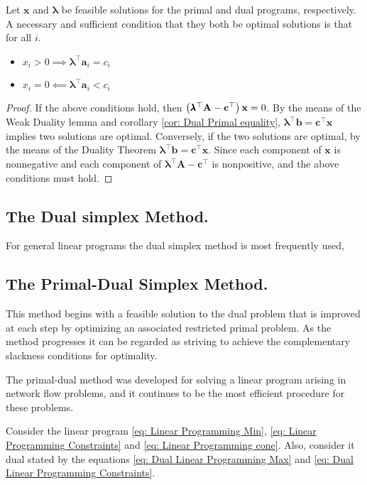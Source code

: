 \begin{theorem}
Let $\mathbf{x}$ and $\pmb{\lambda}$ be feasible solutions for the primal and dual programs, respectively. A necessary and sufficient condition that they both be optimal solutions is that for all $i$.
\begin{itemize}
	\item $x_i>0 \implies \pmb{\lambda}^\top \mathbf{a}_i=c_i$
	\item $x_i=0 \impliedby \pmb{\lambda}^\top \mathbf{a}_i<c_i$ 
\end{itemize}

\end{theorem}

\begin{proof}
If the above conditions hold, then $\left( \pmb{\lambda}^\top \mathbf{A}-\mathbf{c}^\top \right)\mathbf{x}=0$. By the means of the Weak Duality lemma and corollary \ref{cor: Dual Primal equality}, $\pmb{\lambda}^\top\mathbf b =\mathbf c ^ \top\mathbf x$ implies two solutions are optimal. Conversely, if the two solutions are optimal, by the means of the Duality Theorem $\pmb{\lambda}^\top \mathbf{b}= \mathbf{c}^\top \mathbf{x}$. Since each component of $\mathbf{x}$ is nonnegative and each component of  $\pmb{\lambda}^\top\mathbf{A}-\mathbf{c}^\top$ is nonpositive, and the above conditions must hold.
\end{proof}

\subsection{The Dual simplex Method.}
For general linear programs the dual simplex method is most frequently used,
\subsection{The Primal-Dual Simplex Method.}
This method begins with a feasible solution to the dual problem that is improved at each step by optimizing an associated restricted primal problem. As the method progresses it can be regarded as striving to achieve the complementary slackness conditions for optimality. 

The primal-dual method was developed for solving a linear program arising in network flow problems, and it continues to be the most efficient procedure for these problems.

Consider the linear program \eqref{eq: Linear Programming Min}, \eqref{eq: Linear Programming Constraints} and \eqref{eq: Linear Programming cone}. Also, consider it dual stated by the equations \eqref{eq: Dual Linear Programming Max} and \eqref{eq: Dual Linear Programming Constraints}.  

